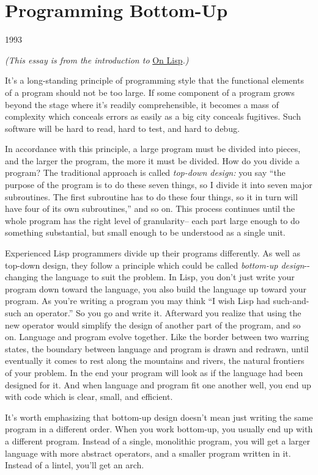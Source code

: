 \chapter{Programming Bottom-Up}

1993

\emph{(This essay is from the introduction to} \href{onlisp.html}{On
Lisp}\emph{.)}

It's a long-standing principle of programming style that the functional
elements of a program should not be too large. If some component of a
program grows beyond the stage where it's readily comprehensible, it
becomes a mass of complexity which conceals errors as easily as a big
city conceals fugitives. Such software will be hard to read, hard to
test, and hard to debug.

In accordance with this principle, a large program must be divided into
pieces, and the larger the program, the more it must be divided. How do
you divide a program? The traditional approach is called \emph{top-down
design:} you say ``the purpose of the program is to do these seven
things, so I divide it into seven major subroutines. The first
subroutine has to do these four things, so it in turn will have four of
its own subroutines,'' and so on. This process continues until the whole
program has the right level of granularity-- each part large enough to
do something substantial, but small enough to be understood as a single
unit.

Experienced Lisp programmers divide up their programs differently. As
well as top-down design, they follow a principle which could be called
\emph{bottom-up design}-\/- changing the language to suit the problem.
In Lisp, you don't just write your program down toward the language, you
also build the language up toward your program. As you're writing a
program you may think ``I wish Lisp had such-and-such an operator.'' So
you go and write it. Afterward you realize that using the new operator
would simplify the design of another part of the program, and so on.
Language and program evolve together. Like the border between two
warring states, the boundary between language and program is drawn and
redrawn, until eventually it comes to rest along the mountains and
rivers, the natural frontiers of your problem. In the end your program
will look as if the language had been designed for it. And when language
and program fit one another well, you end up with code which is clear,
small, and efficient.

It's worth emphasizing that bottom-up design doesn't mean just writing
the same program in a different order. When you work bottom-up, you
usually end up with a different program. Instead of a single, monolithic
program, you will get a larger language with more abstract operators,
and a smaller program written in it. Instead of a lintel, you'll get an
arch.

